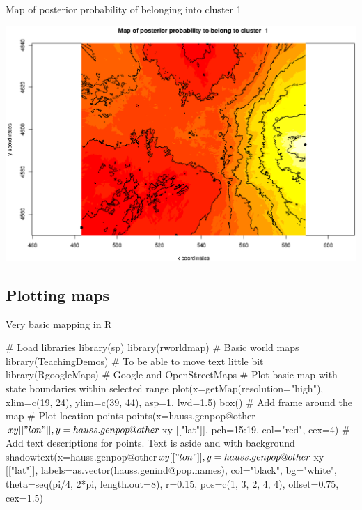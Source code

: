 \documentclass[compress, ucs, xelatex, 11pt, xcolor=svgnames,
  hyperref={
    bookmarks=true,
    unicode=true,
    colorlinks=true,
    pdftitle={Molecular data in R},
    plainpages=false,
    pdfauthor={Vojtech Zeisek},
    pdfsubject={Course about phylogeny and evolution in R},
    pdfcreator={XeLaTeX},
    pdfkeywords={R, evolution, phylogeny, molecular data},
    linkcolor=Tomato,
    anchorcolor=SaddleBrown,
    citecolor=Goldenrod,
    filecolor=DarkMagenta,
    menucolor=Sienna,
    urlcolor=DarkTurquoise,
    pdftex},
  url={hyphens, lowtilde} %
  ]{beamer}
\begin{document}
\begin{frame}{Map of posterior probability of belonging into cluster 1}
\begin{center}
  \includegraphics[width=\textwidth-1.5cm]{geneland2.png}
\end{center}
\end{frame}

\subsection{Plotting maps}

\begin{frame}[fragile]{Very basic mapping in R}
  \begin{spluscode}
    # Load libraries
    library(sp)
    library(rworldmap) # Basic world maps
    library(TeachingDemos) # To be able to move text little bit
    library(RgoogleMaps) # Google and OpenStreetMaps
    # Plot basic map with state boundaries within selected range
    plot(x=getMap(resolution="high"), xlim=c(19, 24), ylim=c(39, 44),
      asp=1, lwd=1.5)
    box() # Add frame around the map
    # Plot location points
    points(x=hauss.genpop@other$xy[["lon"]], y=hauss.genpop@other$xy
      [["lat"]], pch=15:19, col="red", cex=4)
    # Add text descriptions for points. Text is aside and with background
    shadowtext(x=hauss.genpop@other$xy[["lon"]], y=hauss.genpop@other$xy
      [["lat"]], labels=as.vector(hauss.genind@pop.names), col="black",
      bg="white", theta=seq(pi/4, 2*pi, length.out=8), r=0.15,
      pos=c(1, 3, 2, 4, 4), offset=0.75, cex=1.5)
  \end{spluscode}
\end{frame}
\end{document}

